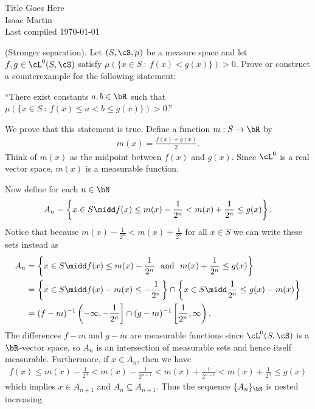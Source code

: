 \pagestyle{empty}
	\LARGE
\begin{center}
	Title Goes Here \\
	\Large
	Isaac Martin \\
    Last compiled \today
\end{center}
\normalsize
\vspace{-2mm}
\hru
{}
\begin{homework}[e]
	 (Stronger separation). Let $(S,\cS,\mu)$ be a measure space and let $f,g \in \cL^0(S,\cS)$ satisfy $\mu(\{x\in S ~:~ f(x) < g(x)\}) > 0$. Prove or construct a counterexample for the following statement:
	\begin{center}
		``There exist constants $a,b \in \bR$ such that $\mu(\{x \in S ~:~ f(x) \leq a < b \leq g(x)\}) > 0$.''
	\end{center}
	\begin{prf}
		We prove that this statement is true. Define a function $m:S\to \bR$ by
		\begin{align*}
			m(x) = \frac{f(x) + g(x)}{2}.
		\end{align*}
		Think of $m(x)$ as the midpoint between $f(x)$ and $g(x)$. Since $\cL^0$ is a real vector space, $m(x)$ is a measurable function.

		Now define for each $n \in \bN$
		\begin{align*}
			A_n = \left\{x \in S \midd f(x) \leq m(x) - \frac{1}{2^n} < m(x) + \frac{1}{2^n} \leq g(x)\right\}.
		\end{align*}
		Notice that because $m(x) - \frac{1}{2^n} < m(x) + \frac{1}{2^n}$ for all $x \in S$ we can write these sets instead as
		\begin{align*}
			A_n &= \left\{x \in S \midd f(x) \leq m(x) - \frac{1}{2^n} ~\text{ and  }~ m(x) + \frac{1}{2^n} \leq g(x)\right\} \\
				&= \left\{x \in S \midd f(x) - m(x)\leq - \frac{1}{2^n}\right\} \cap \left\{x \in S \midd \frac{1}{2^n} \leq g(x) - m(x)\right\} \\
				&= (f - m)^{-1}\left(-\infty, -\frac{1}{2^n}\right] \cap (g - m)^{-1}\left[\frac{1}{2^n},\infty\right).
		\end{align*}
		The differences $f - m$ and $g - m$ are measurable functions since $\cL^0(S,\cS)$ is a $\bR$-vector space, so $A_n$ is an intersection of measurable sets and hence itself measurable. Furthermore, if $x \in A_n$, then we have
		\begin{align*}
			f(x) \leq m(x) - \frac{1}{2^n} < m(x) - \frac{1}{2^{n+1}} < m(x) + \frac{1}{2^{n+1}} < m(x) + \frac{1}{2^n} \leq g(x)
		\end{align*}
		which implies $x \in A_{n+1}$ and $A_n \subseteq A_{n+1}$. Thus the sequence $\{A_n\}_{\bN}$ is nested increasing.


\end{prf}
\end{homework}
